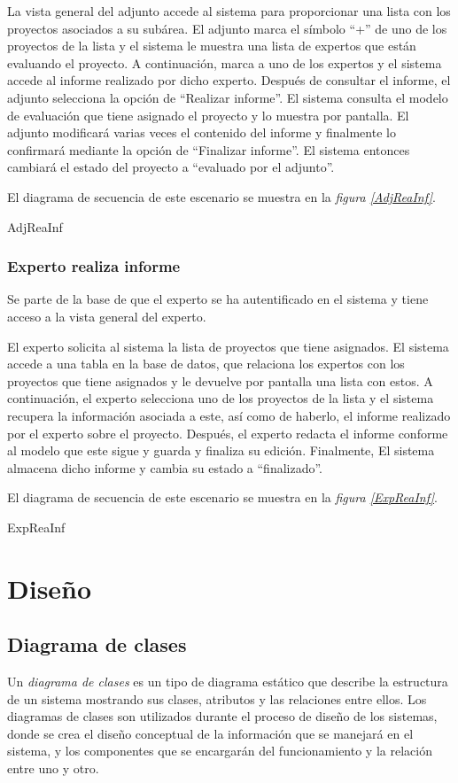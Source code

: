 \documentclass[11pt,a4paper,spanish,twoside]{book}
\begin{document}
La vista general del adjunto accede al sistema para proporcionar una lista
con los proyectos asociados a su subárea. El adjunto marca el símbolo ``+''
de uno de los proyectos de la lista y el sistema le muestra una lista de 
expertos que están evaluando el proyecto. A continuación, marca a uno de los
expertos y el sistema accede al informe realizado por dicho experto. Después
de consultar el informe, el adjunto selecciona la opción de ``Realizar
informe''. El sistema consulta el modelo de evaluación que tiene asignado el
proyecto y lo muestra por pantalla. El adjunto modificará varias veces
el contenido del informe y finalmente lo confirmará mediante la opción de
``Finalizar informe''. El sistema entonces cambiará el estado del proyecto a
``evaluado por el adjunto''.

El diagrama de secuencia de este escenario se muestra en la \emph{figura
\ref{AdjReaInf}}.

{AdjReaInf}

\section{Experto realiza informe}
Se parte de la base de que el experto se ha autentificado en el sistema y
tiene acceso a la vista general del experto.

El experto solicita al sistema la lista de proyectos que tiene asignados. El
sistema accede a una tabla en la base de datos, que relaciona los expertos con
los proyectos que tiene asignados y le devuelve por pantalla una lista con 
estos. A continuación, el experto selecciona uno de los proyectos de la lista
y el sistema recupera la información asociada a este, así como de haberlo, el
informe realizado por el experto sobre el proyecto. Después, el experto
redacta el informe conforme al modelo que este sigue y guarda y finaliza su
edición. Finalmente, El sistema almacena dicho informe y cambia su estado a
``finalizado''.

El diagrama de secuencia de este escenario se muestra en la \emph{figura
\ref{ExpReaInf}}.

{ExpReaInf}

\part{Diseño}
\chapter{Diagrama de clases}
Un \emph{diagrama de clases} es un tipo de diagrama estático que describe la
estructura de un sistema mostrando sus clases, atributos y las relaciones
entre ellos. Los diagramas de clases son utilizados durante el proceso de
diseño de los sistemas, donde se crea el diseño conceptual de la
información que se manejará en el sistema, y los componentes que se
encargarán del funcionamiento y la relación entre uno y otro.
\end{document}
